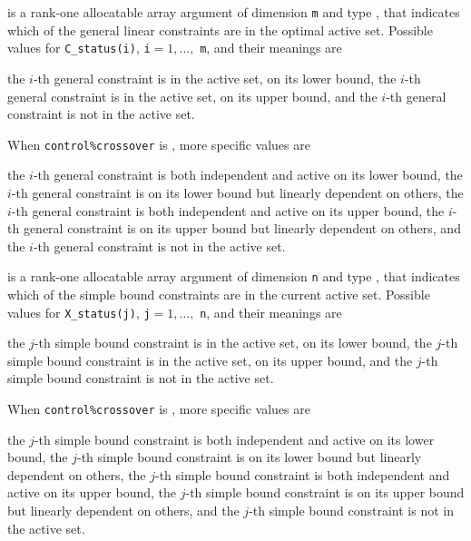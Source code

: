 \documentclass{galahad}
\begin{document}
\begin{description}
 is a rank-one allocatable array argument of dimension {\tt m}
and type \integer, that indicates which of the general linear
constraints are in the optimal active set. Possible values for
{\tt C\_status(i)}, {\tt i}$=1, \ldots ,$ {\tt m}, and their meanings are
\begin{description}
 the $i$-th general constraint
is in the active set, on its lower bound,
 the $i$-th general constraint
is in the active set, on its upper bound, and
  the $i$-th general constraint is not in the active set.
\end{description}
When {\tt control\%crossover} is \true, more specific values are
\begin{description}
 the $i$-th general constraint
is both independent and active on its lower bound,
 the $i$-th general constraint
is on its lower bound but linearly dependent on others,
 the $i$-th general constraint
is both independent and active on its upper bound,
 the $i$-th general constraint
is on its upper bound but linearly dependent on others, and
 the $i$-th general constraint is not in the active set.
\end{description}

 is a rank-one allocatable array argument of dimension {\tt n}
and type \integer, that indicates which of the simple bound
constraints are in the current active set. Possible values for
{\tt X\_status(j)}, {\tt j}$=1, \ldots ,$ {\tt n}, and their meanings are
\begin{description}
 the $j$-th simple bound constraint
is in the active set, on its lower bound,
 the $j$-th simple bound constraint
is in the active set, on its upper bound, and
  the $j$-th simple bound constraint is not in the active set.
\end{description}
When {\tt control\%crossover} is \true, more specific values are
\begin{description}
 the $j$-th simple bound constraint
is both independent and active on its lower bound,
 the $j$-th simple bound constraint
is on its lower bound but linearly dependent on others,
 the $j$-th simple bound constraint
is both independent and active on its upper bound,
 the $j$-th simple bound constraint
is on its upper bound but linearly dependent on others, and
 the $j$-th simple bound constraint is not in the active set.
\end{description}

\end{description}
\end{document}
